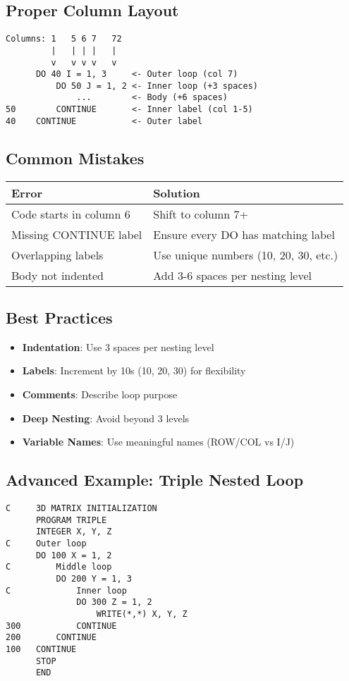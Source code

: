 \documentclass{book}
\begin{document}
\subsection*{Proper Column Layout}
\begin{verbatim}
Columns: 1   5 6 7   72
         |   | | |   |
         v   v v v   v
      DO 40 I = 1, 3     <- Outer loop (col 7)
          DO 50 J = 1, 2 <- Inner loop (+3 spaces)
              ...        <- Body (+6 spaces)
50        CONTINUE       <- Inner label (col 1-5)
40    CONTINUE           <- Outer label
\end{verbatim}

\subsection*{Common Mistakes}
\begin{center}
\begin{tabular}{|p{5cm}|p{9cm}|}
\hline
\textbf{Error} & \textbf{Solution} \\ 
\hline
Code starts in column 6 & Shift to column 7+ \\
\hline
Missing CONTINUE label & Ensure every DO has matching label \\
\hline
Overlapping labels & Use unique numbers (10, 20, 30, etc.) \\
\hline
Body not indented & Add 3-6 spaces per nesting level \\
\hline
\end{tabular}
\end{center}

\subsection*{Best Practices}
\begin{itemize}
\item \textbf{Indentation}: Use 3 spaces per nesting level
\item \textbf{Labels}: Increment by 10s (10, 20, 30) for flexibility
\item \textbf{Comments}: Describe loop purpose
\item \textbf{Deep Nesting}: Avoid beyond 3 levels
\item \textbf{Variable Names}: Use meaningful names (ROW/COL vs I/J)
\end{itemize}

\subsection*{Advanced Example: Triple Nested Loop}
\begin{verbatim}
C     3D MATRIX INITIALIZATION
      PROGRAM TRIPLE
      INTEGER X, Y, Z
C     Outer loop
      DO 100 X = 1, 2
C         Middle loop
          DO 200 Y = 1, 3
C             Inner loop
              DO 300 Z = 1, 2
                  WRITE(*,*) X, Y, Z
300           CONTINUE
200       CONTINUE
100   CONTINUE
      STOP
      END
\end{verbatim}
\end{document}
